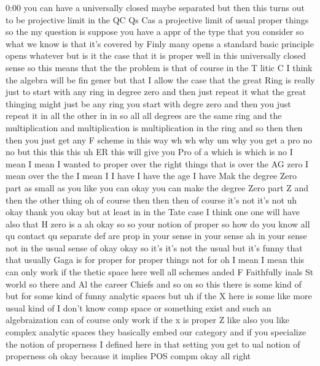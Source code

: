\begin{unfinished}{0:00}
you  can  have  a  universally  closed  maybe
separated  but  then  this  turns  out  to  be
projective  limit  in  the  QC  Qs  Cas  a
projective  limit  of  usual  proper  things
so  the  my  question  is  suppose  you  have  a
appr  of  the  type  that  you  consider  so
what  we  know  is  that  it's  covered  by
Finly  many  opens  a  standard  basic
principle  opens
whatever  but  is  it  the  case  that  it  is
proper  well  in  this  universally  closed
sense  so  this  means  that  the  the  problem
is  that  of  course  in  the  T  litic  C  I
think  the  algebra  will  be  fin  gener  but
that  I  allow  the  case  that  the  great
Ring  is  really  just  to  start  with  any
ring  in  degree  zero  and  then  just  repeat
it  what  the  great  thinging  might  just  be
any  ring  you  start  with  degre  zero  and
then  you  just  repeat  it  in  all  the  other
in  in  so  all  all  degrees  are  the  same
ring  and  the  multiplication  and
multiplication  is  multiplication  in  the
ring  and  so  then  then  then  you  just  get
any  F  scheme  in  this  way
wh  wh  why
um  why  you  get  a  pro  no  no  but  this  this
this  uh  ER  this  will  give  you  Pro  of  a
which  is  which
is  no  I  mean  I  mean  I  wanted  to  proper
over  the  right  things  that  is  over  the
AG  zero  I  mean  over  the  the  I  mean  I  I
have  I  have  the  age  I  have
Mak  the  degree  Zero  part  as  small  as  you
like  you  can  okay  you  can  make  the
degree  Zero  part  Z  and  then  the  other
thing  oh  of  course  then  then  then  of
course  it's  not  it's  not  uh  okay  thank
you  okay  but  at  least  in  in  the  Tate
case  I  think  one  one  will  have  also  that
H  zero  is  a  ah  okay  so  so  your  notion  of
proper  so  how  do  you  know  all  qu  contact
qu  separate  def  are  prop  in  your  sense
in  your  sense  ah  in  your  sense  not  in
the  usual  sense  of  okay  okay  so  it's
it's  not  the
usual  but  it's  funny  that  that  usually
Gaga  is  for
proper  for  proper  things  not  for  oh  I
mean  I  mean  this  can  only  work  if
the  thetic  space  here
well  all  schemes  anded  F  Faithfully
inals  St  world  so  there  and  Al  the
career  Chiefs  and  so  on  so  this  there  is
some  kind  of  but  for  some  kind  of  funny
analytic  spaces  but  uh  if  the  X  here  is
some  like  more  usual  kind  of  I  don't
know  comp  space  or  something  exist  and
such  an  algebraization  can  of  course
only  work  if  the  x  is  proper
Z  like  also
you  like  complex  analytic  spaces  they
basically  embed  our  category  and  if  you
specialize  the  notion  of  properness  I
defined  here  in  that  setting  you  get  to
ual  notion  of  properness
oh
okay  because  it  implies  POS
compm
okay
all
right
\end{unfinished}